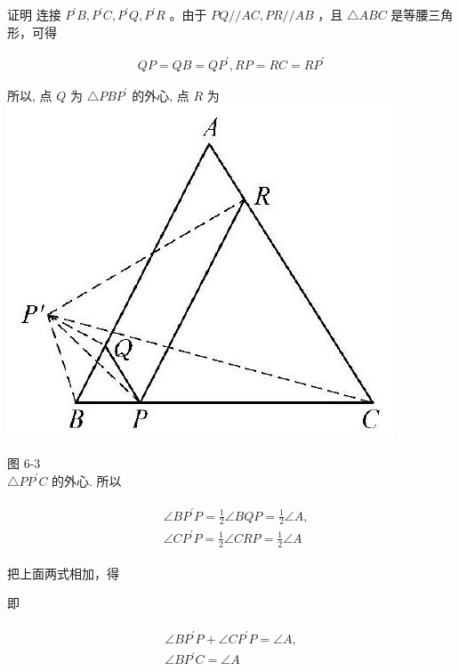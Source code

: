 \documentclass[10pt]{article}
\begin{document}
证明 连接 $P^{\prime} B, P^{\prime} C, P^{\prime} Q, P^{\prime} R$ 。由于 $P Q / / A C, P R / / A B$ ，且 $\triangle A B C$ 是等腰三角形，可得

\begin{align*}
Q P=Q B=Q P^{\prime}, R P=R C=R P^{\prime}
\end{align*}

所以, 点 $Q$ 为 $\triangle P B P^{\prime}$ 的外心, 点 $R$ 为\\
\includegraphics[max width=\textwidth, center]{2024_10_30_66b8e5e701da2093c133g-045}

图 6-3\\
$\triangle P P^{\prime} C$ 的外心. 所以

\begin{align*}
\begin{aligned}
& \angle B P^{\prime} P=\frac{1}{2} \angle B Q P=\frac{1}{2} \angle A, \\
& \angle C P^{\prime} P=\frac{1}{2} \angle C R P=\frac{1}{2} \angle A
\end{aligned}
\end{align*}

把上面两式相加，得

即

\begin{align*}
\begin{gathered}
\angle B P^{\prime} P+\angle C P^{\prime} P=\angle A, \\
\angle B P^{\prime} C=\angle A
\end{gathered}
\end{align*}
\end{document}
